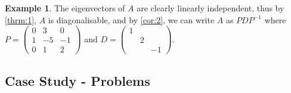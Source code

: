 \documentclass[a4paper]{article}
\theoremstyle{plain}
\theoremstyle{definition}
\newtheorem{example}[theorem]{Example}
\begin{document}
\begin{example}
	The eigenvectors of $A$ are clearly linearly independent, thus by \ref{thrm:1}, $A$ is diagonalisable, and by \ref{cor:2},
	we can write $A$ as $PDP^{-1}$ where $P=\begin{pmatrix}0&3&0\\1&-5&-1\\0&1&2\end{pmatrix}$ and $D=\begin{pmatrix}1&&\\&2&\\&&-1\end{pmatrix}$.
\end{example}
\newpage

\subsection{Case Study - Problems}
\end{document}
